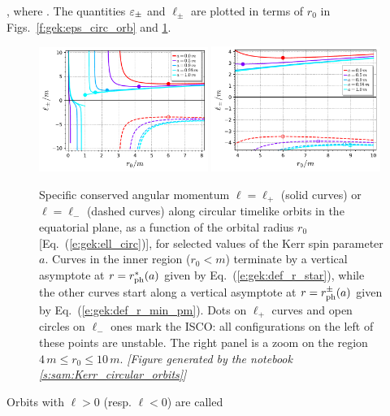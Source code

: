     \encadre{(\veps_-, \ell_-)} ,
\ee
where
\be \label{e:gek:ell_circ}
     .
\ee
The quantities $\varepsilon_\pm$ and $\ell_\pm$ are plotted in terms of $r_0$ in
Figs.~\ref{f:gek:eps_circ_orb} and \ref{f:gek:ell_circ_orb}.
\begin{figure}
\begin{center}
\includegraphics[width=0.49\textwidth]{gek_ell_circ_orb.pdf}
\includegraphics[width=0.49\textwidth]{gek_ell_circ_orb_zoom.pdf}
\end{center}
\caption[]{\label{f:gek:ell_circ_orb} \footnotesize
Specific conserved angular momentum $\ell=\ell_+$ (solid curves) or $\ell=\ell_-$
(dashed curves) along circular timelike
orbits in the equatorial plane, as a function of the orbital radius $r_0$
[Eq.~(\ref{e:gek:ell_circ})], for selected values of the Kerr spin parameter $a$.
Curves in the inner region ($r_0 < m$) terminate by a vertical asymptote at $r = r_{\rm ph}^*(a)$ given
by Eq.~(\ref{e:gek:def_r_star}), while the other curves start along a
vertical asymptote at $r = r_{\rm ph}^\pm(a)$ given by Eq.~(\ref{e:gek:def_r_min_pm}).
Dots on $\ell_+$ curves and open circles on $\ell_-$ ones mark the ISCO: all
configurations on the left of these points are unstable.
The right panel is a zoom on the region $4\,m \leq r_0 \leq 10\,m$.
\textsl{[Figure generated by the notebook \ref{s:sam:Kerr_circular_orbits}]}
}
\end{figure}
Orbits with $\ell > 0$ (resp. $\ell < 0$) are called 
